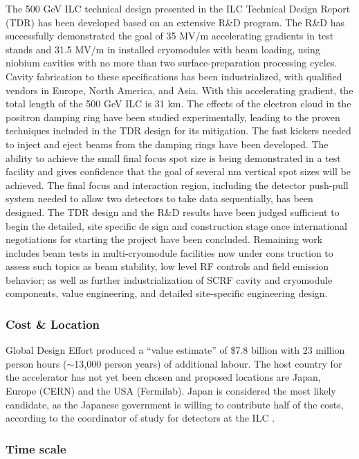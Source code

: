 The 500 GeV ILC technical design presented in the ILC Technical Design Report (TDR) has been developed based on an extensive R\&D program. The R\&D has
successfully demonstrated the goal of 35 MV/m accelerating gradients in test stands and 31.5 MV/m in installed cryomodules with beam loading, using niobium cavities with no more than two surface-preparation processing cycles. Cavity fabrication to these specifications has been industrialized, with qualified vendors in Europe, North America, and Asia. With this accelerating gradient, the total length of the 500 GeV ILC is 31 km. The effects of the electron cloud in the positron damping ring have been studied experimentally, leading to the proven techniques included in the TDR design for its mitigation. The fast kickers needed to inject and eject beams from the damping rings have been developed. The ability to achieve the small final focus spot size is being demonstrated in a test facility and gives confidence that the goal of several nm vertical spot sizes will be achieved. The final focus and interaction region,
including the detector push-pull system needed to allow two detectors to take data sequentially, has been designed. The TDR design and the R\&D results have been judged sufficient to begin the detailed, site specific de sign and construction stage once international negotiations for starting the project have been concluded.
Remaining work includes beam tests in multi-cryomodule facilities now under cons
truction to assess such topics as beam stability, low level RF controls and field emission behavior; as well as further industrialization of SCRF cavity and cryomodule components, value engineering, and detailed site-specific engineering design. \cite{ILC:OtherReport}
 
\subsubsection{Cost \& Location}


Global Design Effort produced a “value estimate” of \$7.8 billion with 23 million person hours ($\sim$13,000 person years) of additional labour.
The host country for the accelerator has not yet been chosen and proposed locations are Japan, Europe (CERN) and the USA (Fermilab). Japan is considered the most likely candidate, as the Japanese government is willing to contribute half of the costs, according to the coordinator of study for detectors at the ILC .
 
\subsubsection{Time scale}

